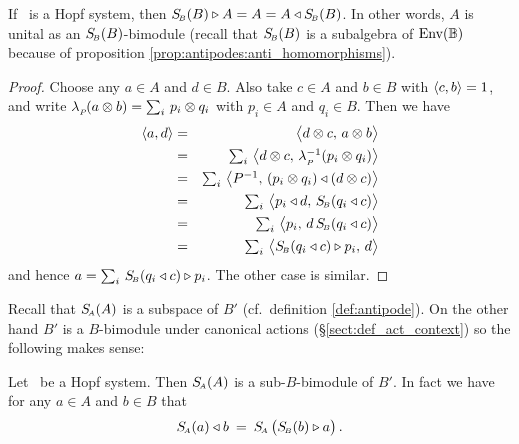 \begin{lemma_sec} \label{lem:unital_over_range_S}
If\/ \pairAB\ is a Hopf system,
then\/ $S_{\scriptscriptstyle \! B}(B) \triangleright A = A = A \triangleleft S_{\scriptscriptstyle \! B}(B)$.
In other words, $A$ is unital as an\/ $S_{\scriptscriptstyle \! B}(B)$-bimodule
\rm (recall that $S_{\scriptscriptstyle \! B}(B)$ is a subalgebra of $\mbox{\rm Env}(\mathbb{B})$ because of
     proposition \ref{prop:antipodes:anti_homomorphisms}).
\end{lemma_sec}
\begin{proof}
Choose any $a \in A$ and $d \in B$.
Also take $c \in A$ and $b \in B$ with $\langle c,b \rangle=1$, and write
$\lambda_{_P\!}(a \otimes b) = \sum_i \, p_i \otimes q_i$ with $p_i \in A$ and $q_i \in B$.
Then we have
\begin{eqnarray*}
      \pair{a}{d}
&=&
      \pairM{d \tens c}{a \tens b}
\\&=&
      \textstyle \sum_i \,  \pairM{d \tens c}{\lp^{-1}(p_i \tens q_i)}
\\&=&
      \textstyle \sum_i \,  \pairM{P^{-1}}{(p_i \tens q_i) \ract (d \tens c)}
\\&=&
      \textstyle \sum_i \,  \pairM{p_i \ract d}{\SB(q_i \ract c)}
\\&=&
      \textstyle \sum_i \,  \pairM{p_i}{d\, \SB(q_i \ract c)}
\\&=&
      \textstyle \sum_i \,  \pairM{\SB(q_i \ract c) \lact p_i}{d}
\end{eqnarray*}
and hence $a = \sum_i \, S_{\scriptscriptstyle \! B}(q_i \triangleleft c) \triangleright p_i$. The other case is similar.
\end{proof}
\vspace{2ex}


Recall that $S_{\scriptscriptstyle \! A}(A)$ is a subspace of $B'$ (cf.\ definition \ref{def:antipode}).
On the other hand $B'$ is a $B$-bimodule under canonical actions
(\S \ref{sect:def_act_context}) so the following makes sense:

\begin{lemma_sec}
Let\/ \pairAB\ be a Hopf system. Then\/ $S_{\scriptscriptstyle \! A}(A)$ is a sub-$B$-bimodule of\/ $B'$.
In fact we have for any\/ $a \in A$ and\/ $b \in B$ that
\begin{equation} \label{eq:lemma:antipode_and_actions}
  \SA(a) \ract b  \:=\:  \SA\left(\vertM  \SB(b) \lact a\right).
\end{equation}
\end{lemma_sec}

